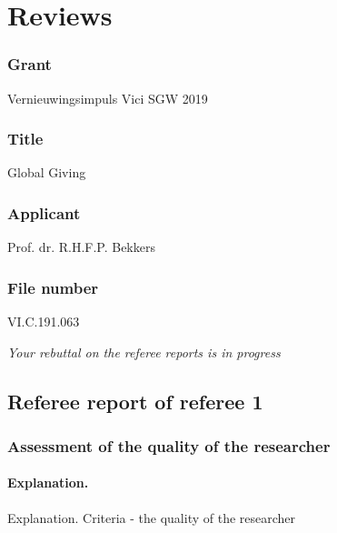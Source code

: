 \documentclass[twocolumn, serif, rga, numeric]{jote-article}
\begin{document}
 {}\section*{Reviews} 
 {}\subsubsection*{Grant} 
Vernieuwingsimpuls Vici SGW 2019
 {}\subsubsection*{Title } 
Global Giving
 {}\subsubsection*{Applicant} 
Prof. dr. R.H.F.P. Bekkers
 {}\subsubsection*{File number} 
VI.C.191.063

\noindent \textit{Your rebuttal on the referee reports is in progress}

 {}\subsection*{Referee report of referee 1} 

 {}\subsubsection*{Assessment of the quality of the researcher} 

\paragraph{Explanation.} Explanation. Criteria - the quality of the researcher
\end{document}
